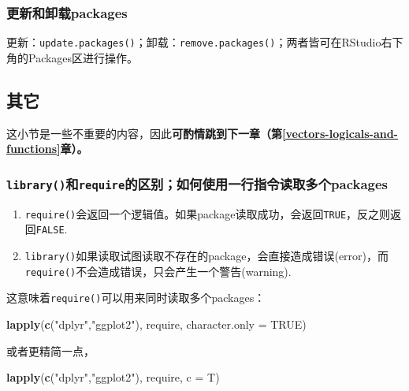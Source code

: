 \documentclass[]{book}
\newenvironment{Shaded}{\begin{snugshade}}{\end{snugshade}}
\newcommand{\DataTypeTok}[1]{\textcolor[rgb]{0.13,0.29,0.53}{#1}}
\newcommand{\KeywordTok}[1]{\textcolor[rgb]{0.13,0.29,0.53}{\textbf{#1}}}
\newcommand{\NormalTok}[1]{#1}
\newcommand{\OtherTok}[1]{\textcolor[rgb]{0.56,0.35,0.01}{#1}}
\newcommand{\StringTok}[1]{\textcolor[rgb]{0.31,0.60,0.02}{#1}}
\providecommand{\tightlist}{%
  \setlength{\itemsep}{0pt}\setlength{\parskip}{0pt}}
\begin{document}
\hypertarget{update-and-uninstall}{%
\subsubsection{更新和卸载packages}\label{update-and-uninstall}}

更新：\texttt{update.packages()}；卸载：\texttt{remove.packages()}；两者皆可在RStudio右下角的Packages区进行操作。

\hypertarget{package-misc}{%
\subsection{其它}\label{package-misc}}

这小节是一些不重要的内容，因此\textbf{可酌情跳到下一章（第\ref{vectors-logicals-and-functions}章）。}

\hypertarget{require-and-library}{%
\subsubsection{\texorpdfstring{\texttt{library()}和\texttt{require}的区别；如何使用一行指令读取多个packages}{library()和require的区别；如何使用一行指令读取多个packages}}\label{require-and-library}}

\begin{enumerate}
\def\labelenumi{\arabic{enumi}.}
\tightlist
\item
  \texttt{require()}会返回一个逻辑值。如果package读取成功，会返回\texttt{TRUE}，反之则返回\texttt{FALSE}.
\item
  \texttt{library()}如果读取试图读取不存在的package，会直接造成错误(error)，而\texttt{require()}不会造成错误，只会产生一个警告(warning).
\end{enumerate}

这意味着\texttt{require()}可以用来同时读取多个packages：

\begin{Shaded}
\begin{Highlighting}[]
\KeywordTok{lapply}\NormalTok{(}\KeywordTok{c}\NormalTok{(}\StringTok{"dplyr"}\NormalTok{,}\StringTok{"ggplot2"}\NormalTok{), require, }\DataTypeTok{character.only =} \OtherTok{TRUE}\NormalTok{)}
\end{Highlighting}
\end{Shaded}

或者更精简一点，

\begin{Shaded}
\begin{Highlighting}[]
\KeywordTok{lapply}\NormalTok{(}\KeywordTok{c}\NormalTok{(}\StringTok{"dplyr"}\NormalTok{,}\StringTok{"ggplot2"}\NormalTok{), require, }\DataTypeTok{c =}\NormalTok{ T)}
\end{Highlighting}
\end{Shaded}
\end{document}
